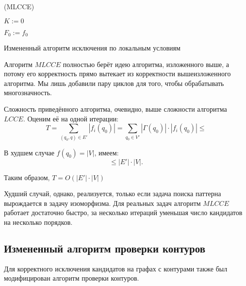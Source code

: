 \begin{algorithm}[H]
	\Large
	\Begin(MLCCE){
		$K := 0$
		
		$F_0 := f_0$
		
	}
	
	\caption{Измененный алгоритм исключения по локальным условиям}
	\label{alg:MLCCE}
\end{algorithm}

Алгоритм $MLCCE$ полностью берёт идею алгоритма, изложенного выше, а потому его корректность прямо вытекает из корректности вышеизложенного алгоритма. Мы лишь добавили пару циклов для того, чтобы обрабатывать многозначность.

Сложность приведённого алгоритма, очевидно, выше сложности алгоритма $LCCE$. Оценим её на одной итерации:
\[T = \sum\limits_{(q_0, q) \in E'}  |f_i(q_0)| = \sum\limits_{q_0 \in V'}  |\Gamma(q_0)|\cdot|f_i(q_0)| \le \]

В худшем случае $f(q_0) = |V|$, имеем:
\[ \le |E'|\cdot|V|. \]

Таким образом, $T = O(|E'|\cdot|V|)$

Худший случай, однако, реализуется, только если задача поиска паттерна вырождается в задачу изоморфизма. Для реальных задач алгоритм $MLCCE$ работает достаточно быстро, за несколько итераций уменьшая число кандидатов на несколько порядков.

\subsection{Измененный алгоритм проверки контуров}

Для корректного исключения кандидатов на графах с контурами также был модифицирован алгоритм проверки контуров. 

